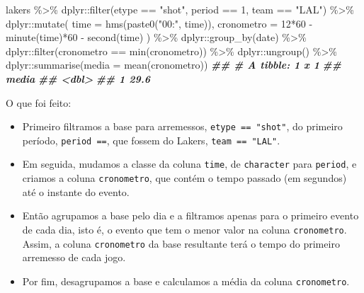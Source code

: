 \documentclass[
]{book}
\newenvironment{Shaded}{\begin{snugshade}}{\end{snugshade}}
\newcommand{\AttributeTok}[1]{\textcolor[rgb]{0.77,0.63,0.00}{#1}}
\newcommand{\DecValTok}[1]{\textcolor[rgb]{0.00,0.00,0.81}{#1}}
\newcommand{\DocumentationTok}[1]{\textcolor[rgb]{0.56,0.35,0.01}{\textbf{\textit{#1}}}}
\newcommand{\FunctionTok}[1]{\textcolor[rgb]{0.00,0.00,0.00}{#1}}
\newcommand{\NormalTok}[1]{#1}
\newcommand{\SpecialCharTok}[1]{\textcolor[rgb]{0.00,0.00,0.00}{#1}}
\newcommand{\StringTok}[1]{\textcolor[rgb]{0.31,0.60,0.02}{#1}}
\begin{document}
\begin{Shaded}
\begin{Highlighting}[]
\NormalTok{lakers }\SpecialCharTok{\%\textgreater{}\%} 
\NormalTok{  dplyr}\SpecialCharTok{::}\FunctionTok{filter}\NormalTok{(etype }\SpecialCharTok{==} \StringTok{"shot"}\NormalTok{, period }\SpecialCharTok{==} \DecValTok{1}\NormalTok{, team }\SpecialCharTok{==} \StringTok{"LAL"}\NormalTok{) }\SpecialCharTok{\%\textgreater{}\%} 
\NormalTok{  dplyr}\SpecialCharTok{::}\FunctionTok{mutate}\NormalTok{(}
    \AttributeTok{time =} \FunctionTok{hms}\NormalTok{(}\FunctionTok{paste0}\NormalTok{(}\StringTok{"00:"}\NormalTok{, time)),}
    \AttributeTok{cronometro =} \DecValTok{12}\SpecialCharTok{*}\DecValTok{60} \SpecialCharTok{{-}} \FunctionTok{minute}\NormalTok{(time)}\SpecialCharTok{*}\DecValTok{60} \SpecialCharTok{{-}} \FunctionTok{second}\NormalTok{(time)}
\NormalTok{  ) }\SpecialCharTok{\%\textgreater{}\%} 
\NormalTok{  dplyr}\SpecialCharTok{::}\FunctionTok{group\_by}\NormalTok{(date) }\SpecialCharTok{\%\textgreater{}\%} 
\NormalTok{  dplyr}\SpecialCharTok{::}\FunctionTok{filter}\NormalTok{(cronometro }\SpecialCharTok{==} \FunctionTok{min}\NormalTok{(cronometro)) }\SpecialCharTok{\%\textgreater{}\%} 
\NormalTok{  dplyr}\SpecialCharTok{::}\FunctionTok{ungroup}\NormalTok{() }\SpecialCharTok{\%\textgreater{}\%} 
\NormalTok{  dplyr}\SpecialCharTok{::}\FunctionTok{summarise}\NormalTok{(}\AttributeTok{media =} \FunctionTok{mean}\NormalTok{(cronometro))}
\DocumentationTok{\#\# \# A tibble: 1 x 1}
\DocumentationTok{\#\#   media}
\DocumentationTok{\#\#   \textless{}dbl\textgreater{}}
\DocumentationTok{\#\# 1  29.6}
\end{Highlighting}
\end{Shaded}

O que foi feito:

\begin{itemize}
\item
  Primeiro filtramos a base para arremessos, \texttt{etype\ ==\ "shot"}, do primeiro período, \texttt{period\ ==}, que fossem do Lakers, \texttt{team\ ==\ "LAL"}.
\item
  Em seguida, mudamos a classe da coluna \texttt{time}, de \texttt{character} para \texttt{period}, e criamos a coluna \texttt{cronometro}, que contém o tempo passado (em segundos) até o instante do evento.
\item
  Então agrupamos a base pelo dia e a filtramos apenas para o primeiro evento de cada dia, isto é, o evento que tem o menor valor na coluna \texttt{cronometro}. Assim, a coluna \texttt{cronometro} da base resultante terá o tempo do primeiro arremesso de cada jogo.
\item
  Por fim, desagrupamos a base e calculamos a média da coluna \texttt{cronometro}.
\end{itemize}
\end{document}
